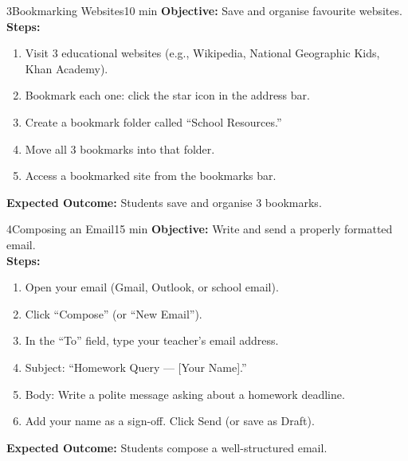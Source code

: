 \begin{labactivity}{3}{Bookmarking Websites}{10 min}
\textbf{Objective:} Save and organise favourite websites.\\[4pt]
\textbf{Steps:}
\begin{enumerate}[label=\protect\stepcircle{\arabic*}, leftmargin=2cm, itemsep=4pt]
  \item Visit 3 educational websites (e.g., Wikipedia, National Geographic Kids, Khan Academy).
  \item Bookmark each one: click the star icon in the address bar.
  \item Create a bookmark folder called ``School Resources.''
  \item Move all 3 bookmarks into that folder.
  \item Access a bookmarked site from the bookmarks bar.
\end{enumerate}
\textbf{Expected Outcome:} Students save and organise 3 bookmarks.
\welldone
\end{labactivity}

\begin{labactivity}{4}{Composing an Email}{15 min}
\textbf{Objective:} Write and send a properly formatted email.\\[4pt]
\textbf{Steps:}
\begin{enumerate}[label=\protect\stepcircle{\arabic*}, leftmargin=2cm, itemsep=4pt]
  \item Open your email (Gmail, Outlook, or school email).
  \item Click ``Compose'' (or ``New Email'').
  \item In the ``To'' field, type your teacher's email address.
  \item Subject: ``Homework Query --- [Your Name].''
  \item Body: Write a polite message asking about a homework deadline.
  \item Add your name as a sign-off. Click Send (or save as Draft).
\end{enumerate}
\textbf{Expected Outcome:} Students compose a well-structured email.
\welldone
\end{labactivity}

